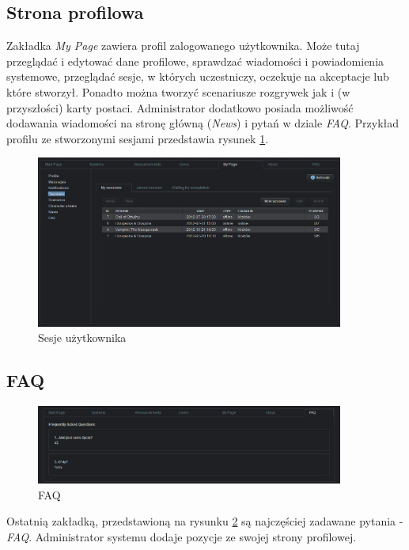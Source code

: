 \subsection*{Strona profilowa}
\label{sec:my_page}
\hspace{15pt}Zakładka \emph{My Page} zawiera profil zalogowanego użytkownika. Może tutaj przeglądać i edytować dane profilowe, sprawdzać wiadomości i powiadomienia systemowe, przeglądać sesje, w których uczestniczy, oczekuje na akceptacje lub które stworzył. Ponadto można tworzyć scenariusze rozgrywek jak i (w przyszłości) karty postaci. Administrator dodatkowo posiada możliwość dodawania wiadomości na stronę główną (\emph{News}) i pytań w dziale \emph{FAQ}. Przykład profilu ze stworzonymi sesjami przedstawia rysunek \ref{fig:mypage_sessions}.

\begin{figure}[h!]	
\centering
\includegraphics[width=0.9\textwidth]{./img/interfejsy/mypage_sessions}
\caption{Sesje użytkownika}
\label{fig:mypage_sessions}
\end{figure}

\subsection*{FAQ}
\label{sec:faq}

\begin{figure}[h!]	
\centering
\includegraphics[width=0.9\textwidth]{./img/interfejsy/faq}
\caption{FAQ}
\label{fig:faq}

\end{figure}
\hspace{15pt}Ostatnią zakładką, przedstawioną na rysunku \ref{fig:faq} są najczęściej zadawane pytania - \emph{FAQ}. Administrator systemu dodaje pozycje ze swojej strony profilowej.


